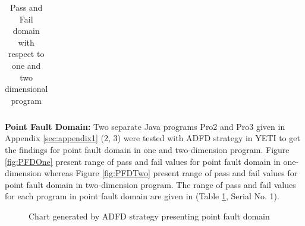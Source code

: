 \begin{table}[h]
\begin{tabular}{|c|c|c|l|l|l|}
				
\end{tabular}
\bigskip
\caption{Pass and Fail domain with respect to one and two dimensional program}
\label{table:failtable}
\end{table}




\noindent \textbf{Point Fault Domain:}  Two separate Java programs Pro2 and Pro3 given in Appendix \ref{sec:appendix1} (2, 3) were tested with ADFD strategy in YETI to get the findings for point fault domain in one and two-dimension program. Figure \ref{fig:PFDOne} present range of pass and fail values for point fault domain in one-dimension whereas Figure \ref{fig:PFDTwo} present range of pass and fail values for point fault domain in two-dimension program. The range of pass and fail values for each program in point fault domain are given in (Table \ref{table:failtable}, Serial No. 1).

\begin{figure} [H]



\caption{Chart generated by ADFD strategy presenting point fault domain}
\end{figure}


